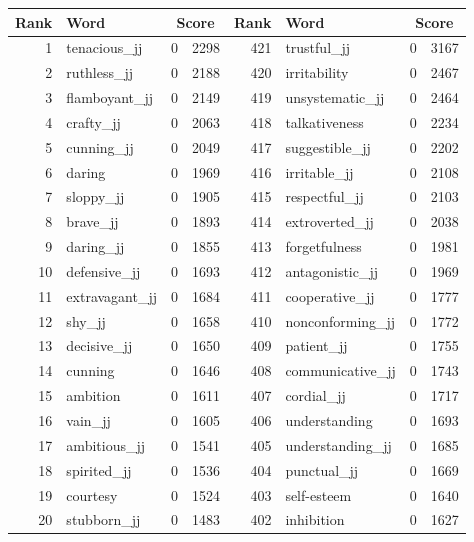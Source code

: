 \begin{table}[tbp]
    \begin{tabular}{| rlr@{.}l | rlr@{.}l |}
    \hline
    \textbf{Rank} & \textbf{Word} & \multicolumn{2}{c|}{\textbf{Score}} & \textbf{Rank} & \textbf{Word} & \multicolumn{2}{c|}{\textbf{Score}} \\
    \hline
    1 & tenacious\_jj & 0 & 2298    &    421 & trustful\_jj & 0 & 3167 \\
    2 & ruthless\_jj & 0 & 2188    &    420 & irritability & 0 & 2467 \\
    3 & flamboyant\_jj & 0 & 2149    &    419 & unsystematic\_jj & 0 & 2464 \\
    4 & crafty\_jj & 0 & 2063    &    418 & talkativeness & 0 & 2234 \\
    5 & cunning\_jj & 0 & 2049    &    417 & suggestible\_jj & 0 & 2202 \\
    6 & daring & 0 & 1969    &    416 & irritable\_jj & 0 & 2108 \\
    7 & sloppy\_jj & 0 & 1905    &    415 & respectful\_jj & 0 & 2103 \\
    8 & brave\_jj & 0 & 1893    &    414 & extroverted\_jj & 0 & 2038 \\
    9 & daring\_jj & 0 & 1855    &    413 & forgetfulness & 0 & 1981 \\
    10 & defensive\_jj & 0 & 1693    &    412 & antagonistic\_jj & 0 & 1969 \\
    11 & extravagant\_jj & 0 & 1684    &    411 & cooperative\_jj & 0 & 1777 \\
    12 & shy\_jj & 0 & 1658    &    410 & nonconforming\_jj & 0 & 1772 \\
    13 & decisive\_jj & 0 & 1650    &    409 & patient\_jj & 0 & 1755 \\
    14 & cunning & 0 & 1646    &    408 & communicative\_jj & 0 & 1743 \\
    15 & ambition & 0 & 1611    &    407 & cordial\_jj & 0 & 1717 \\
    16 & vain\_jj & 0 & 1605    &    406 & understanding & 0 & 1693 \\
    17 & ambitious\_jj & 0 & 1541    &    405 & understanding\_jj & 0 & 1685 \\
    18 & spirited\_jj & 0 & 1536    &    404 & punctual\_jj & 0 & 1669 \\
    19 & courtesy & 0 & 1524    &    403 & self-esteem & 0 & 1640 \\
    20 & stubborn\_jj & 0 & 1483    &    402 & inhibition & 0 & 1627 \\

\end{tabular}
\end{table}
